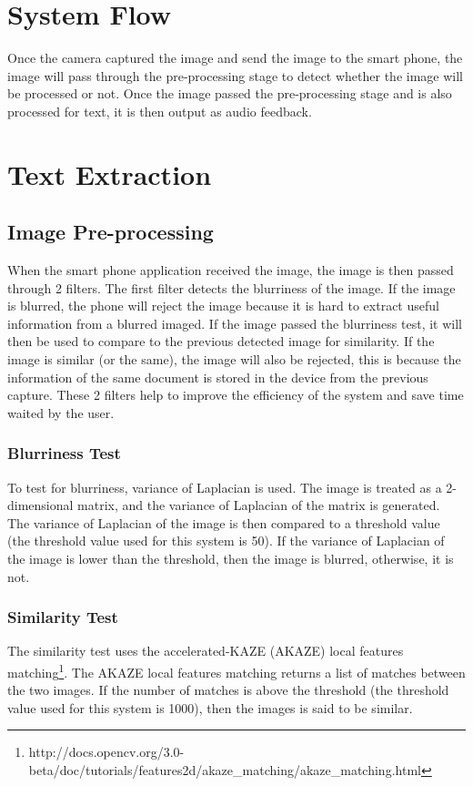 \section{System Flow}
Once the camera captured the image and send the image to the smart phone, the image will pass through the pre-processing stage to detect whether the image will be processed or not. Once the image passed the pre-processing stage and is also processed for text, it is then output as audio feedback.

\section{Text Extraction}
\subsection{Image Pre-processing}
When the smart phone application received the image, the image is then passed through 2 filters. The first filter detects the blurriness of the image. If the image is blurred, the phone will reject the image because it is hard to extract useful information from a blurred imaged. If the image passed the blurriness test, it will then be used to compare to the previous detected image for similarity. If the image is similar (or the same), the image will also be rejected, this is because the information of the same document is stored in the device from the previous capture. These 2 filters help to improve the efficiency of the system and save time waited by the user.

\subsubsection{Blurriness Test}
To test for blurriness, variance of Laplacian is used. The image is treated as a 2-dimensional matrix, and the variance of Laplacian of the matrix is generated. The variance of Laplacian of the image is then compared to a threshold value (the threshold value used for this system is 50). If the variance of Laplacian of the image is lower than the threshold, then the image is blurred, otherwise, it is not.

\subsubsection{Similarity Test}
The similarity test uses the accelerated-KAZE (AKAZE) local features matching\footnote{http://docs.opencv.org/3.0-beta/doc/tutorials/features2d/akaze\_matching/akaze\_matching.html}. The AKAZE local features matching returns a list of matches between the two images. If the number of matches is above the threshold (the threshold value used for this system is 1000), then the images is said to be similar.

